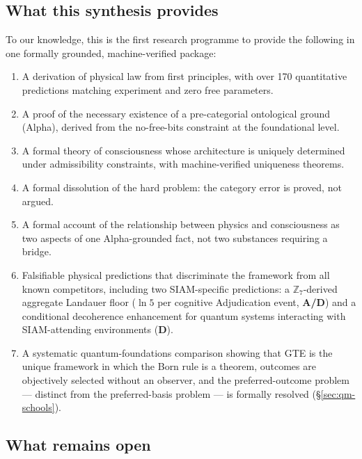 \documentclass[11pt]{article}
\theoremstyle{remark}
\newcommand{\CatAD}{\textbf{A/D}}
\newcommand{\CatD}{\textbf{D}}
\begin{document}
\subsection{What this synthesis provides}

To our knowledge, this is the first research programme to provide the following in
one formally grounded, machine-verified package:

\begin{enumerate}
  \item A derivation of physical law from first principles, with over 170 quantitative
    predictions matching experiment and zero free parameters.

  \item A proof of the necessary existence of a pre-categorial ontological ground
    (Alpha), derived from the no-free-bits constraint at the foundational level.

  \item A formal theory of consciousness whose architecture is uniquely determined
    under admissibility constraints, with machine-verified uniqueness theorems.

  \item A formal dissolution of the hard problem: the category error is proved,
    not argued.

  \item A formal account of the relationship between physics and consciousness as
    two aspects of one Alpha-grounded fact, not two substances requiring a bridge.

  \item Falsifiable physical predictions that discriminate the framework from all
    known competitors, including two SIAM-specific predictions: a
    $\mathbb{Z}_7$-derived aggregate Landauer floor ($\ln 5$ per cognitive Adjudication
    event, \CatAD) and a conditional decoherence enhancement for quantum systems
    interacting with SIAM-attending environments (\CatD).

  \item A systematic quantum-foundations comparison showing that GTE is the unique
    framework in which the Born rule is a theorem, outcomes are objectively selected
    without an observer, and the preferred-outcome problem --- distinct from the
    preferred-basis problem --- is formally resolved (\S\ref{sec:qm-schools}).
\end{enumerate}

\subsection{What remains open}
\end{document}
